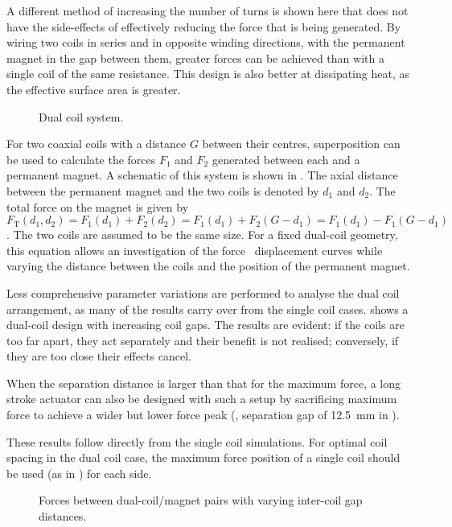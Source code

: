 A different method of increasing the number of turns is shown here
that does not have the side-effects of effectively reducing the force
that is being generated. By wiring two coils in series and in opposite
winding directions, with the permanent magnet in the gap between them,
greater forces can be achieved than with a single coil of the same
resistance. This design is also better at dissipating heat, as the effective
surface area is greater.

\begin{figure}
  \caption{Dual coil system.}
\end{figure}

For two coaxial coils with a distance $G$ between their
centres, superposition can be used to calculate the forces $F_1$ and
$F_2$ generated between each and a permanent magnet. A schematic of this
system is shown in . The axial
distance between the permanent magnet and the two coils is denoted by
$d_1$ and $d_2$. The total force on the magnet is given by
\begin{dmath}
F_{\mathrm{T}}(d_1,d_2)
  =F_1(d_1)+F_2(d_2)
  =F_1(d_1)+F_2(G-d_1)
  =F_1(d_1)-F_1(G-d_1)
\end{dmath}.
The two coils are assumed to be the same size.
For a fixed dual-coil geometry, this equation allows an
investigation of the force \vs\ displacement curves while varying the
distance between the coils and the position of the permanent magnet.

Less comprehensive parameter variations are performed to analyse the dual coil
arrangement, as many of the results carry over from the single coil
cases.  shows a dual-coil design with increasing coil
gaps. The results are evident: if the coils are too far apart, they
act separately and their benefit is not realised; conversely, if they
are too close their effects cancel.

When the separation distance is larger than that for the maximum force, a long stroke actuator can also be designed with such a setup by sacrificing maximum force to achieve a wider but lower force peak (\eg, separation gap of \SI{12.5}{mm} in ).


These results follow directly from the single coil simulations. For
optimal coil spacing in the dual coil case, the maximum force position
of a single coil should be used (as in ) for each
side. 

\begin{figure}
  \begin{subfigure}
  \end{subfigure}\par
  \begin{subfigure}
  \end{subfigure}
  \caption{Forces between dual-coil/magnet pairs with varying
    inter-coil gap distances. }
\end{figure}
